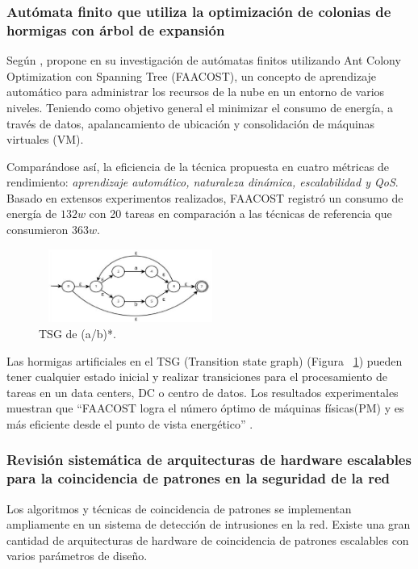 \documentclass[10pt,conference]{IEEEtran}
\begin{document}
\subsubsection{\textbf{Autómata finito que utiliza la optimización de colonias de hormigas con árbol de expansión}}

    Según , propone en su investigación de autómatas finitos utilizando Ant Colony Optimization con Spanning Tree (FAACOST), un concepto de aprendizaje automático para administrar los recursos de la nube en un entorno de varios niveles. Teniendo como objetivo general el minimizar el consumo de energía, a través de datos, apalancamiento de ubicación y consolidación de máquinas virtuales (VM).
    
    Comparándose así, la eficiencia de la técnica propuesta en cuatro métricas de rendimiento: \textit{aprendizaje automático, naturaleza dinámica, escalabilidad y QoS}. Basado en
    extensos experimentos realizados, FAACOST registró un consumo de energía de $132 w$ con 20 tareas en comparación a las técnicas de referencia que consumieron $363 w$.

    \begin{figure}[H]
    \begin{center}
    \includegraphics[width=6cm, height=2.4cm]{Ind.Tecnolo/Ant.JPG}
    \caption{TSG de (a/b)*.}
    \label{Tec.1} 
    \end{center}
    \end{figure}
    
    Las hormigas artificiales en el TSG (Transition state graph) (Figura ~\ref{Tec.1}) pueden tener cualquier estado inicial y realizar transiciones para el procesamiento de tareas en un data centers, DC o centro de datos. 
    Los resultados experimentales muestran que ``FAACOST logra el número óptimo de máquinas físicas(PM) y es más eficiente desde el punto de vista energético''  \cite[p.~11]{aliyu2021management}.
    
\vspace{2.5mm}    
\subsubsection{\textbf{Revisión sistemática de arquitecturas de hardware escalables para la coincidencia de patrones en la seguridad de la red}}    
    Los algoritmos y técnicas de coincidencia de patrones se implementan ampliamente en un sistema de detección de intrusiones en la red. Existe una gran cantidad de arquitecturas de hardware de coincidencia de patrones escalables con varios parámetros de diseño.
\end{document}
